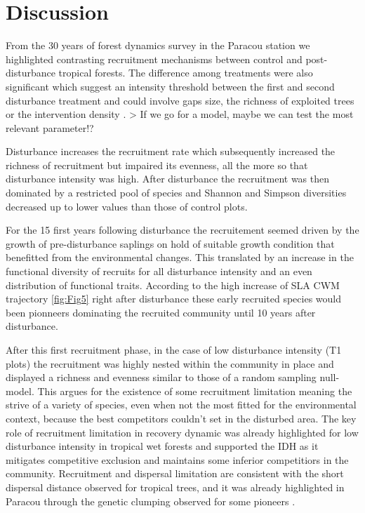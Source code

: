 \documentclass[fleqn,10pt]{ArtEcoFoG} %
\begin{document}
\section{Discussion}\label{discussion}

From the 30 years of forest dynamics survey in the Paracou station we
highlighted contrasting recruitment mechanisms between control and
post-disturbance tropical forests. The difference among treatments were
also significant which suggest an intensity threshold between the first
and second disturbance treatment and could involve gaps size, the
richness of exploited trees or the intervention density
\citep{Denslow1980}. \textgreater{} If we go for a model, maybe we can
test the most relevant parameter!?

Disturbance increases the recruitment rate which subsequently increased
the richness of recruitment but impaired its evenness, all the more so
that disturbance intensity was high. After disturbance the recruitment
was then dominated by a restricted pool of species and Shannon and
Simpson diversities decreased up to lower values than those of control
plots.

For the 15 first years following disturbance the recruitement seemed
driven by the growth of pre-disturbance saplings on hold of suitable
growth condition that benefitted from the environmental changes. This
translated by an increase in the functional diversity of recruits for
all disturbance intensity and an even distribution of functional traits.
According to the high increase of SLA CWM trajectory \ref{fig:Fig5}
right after disturbance these early recruited species would been
pionneers dominating the recruited community until 10 years after
disturbance.

After this first recruitment phase, in the case of low disturbance
intensity (T1 plots) the recruitment was highly nested within the
community in place and displayed a richness and evenness similar to
those of a random sampling null-model. This argues for the existence of
some recruitment limitation meaning the strive of a variety of species,
even when not the most fitted for the environmental context, because the
best competitors couldn't set in the disturbed area. The key role of
recruitment limitation in recovery dynamic was already highlighted for
low disturbance intensity in tropical wet forests
\citep{Hubbell1999, Sheil2003, Bongers2009} and supported the IDH as it
mitigates competitive exclusion and maintains some inferior competitiors
in the community. Recruitment and dispersal limitation are consistent
with the short dispersal distance observed for tropical trees, and it
was already highlighted in Paracou through the genetic clumping observed
for some pioneers \citep{Leclerc2015, Scotti2015a}.
\end{document}
